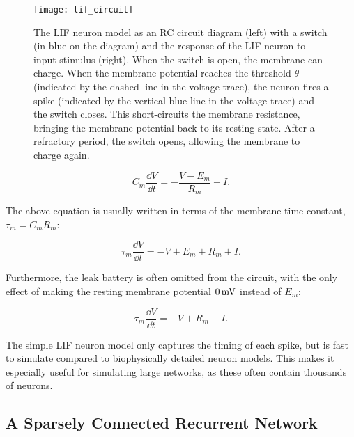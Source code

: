 \begin{figure}[!htb]
    \centering
    \texttt{[image: lif\_circuit]}
    \caption{The LIF neuron model as an RC circuit diagram (left) with a switch (in blue on the diagram) and the response of the LIF neuron to input stimulus (right). When the switch is open, the membrane can charge. When the membrane potential reaches the threshold $\theta$ (indicated by the dashed line in the voltage trace), the neuron fires a spike (indicated by the vertical blue line in the voltage trace) and the switch closes. This short-circuits the membrane resistance, bringing the membrane potential back to its resting state. After a refractory period, the switch opens, allowing the membrane to charge again.
    }
    \label{fig:lif_circuit}
\end{figure}

\begin{equation*}
    C_m \frac{\dd{V}}{\dd{t}} = - \frac{V-E_m}{R_m} + I.
\end{equation*}

The above equation is usually written in terms of the membrane time constant, $\tau_m = C_m R_m$: 

\begin{equation*}
    \tau_m \frac{\dd{V}}{\dd{t}} = - V + E_m + R_m + I.
\end{equation*}

Furthermore, the leak battery is often omitted from the circuit, with the only effect of making the resting membrane potential $0\,\mathrm{mV}$ instead of $E_m$: 

\begin{equation}\label{eq:lif_model}
    \tau_m \frac{\dd{V}}{\dd{t}} = - V + R_m + I.
\end{equation}

The simple LIF neuron model only captures the timing of each spike, but is fast to simulate compared to biophysically detailed neuron models. This makes it especially useful for simulating large networks, as these often contain thousands of neurons. 



\subsection{A Sparsely Connected Recurrent Network}\label{sec:recurrent_network}

